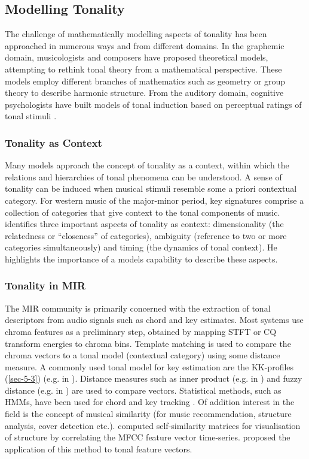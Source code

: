 \documentclass{article}
\begin{document}
\subsection{Modelling Tonality}
\label{sec-2-2}

The challenge of mathematically modelling aspects of tonality has been
approached in numerous ways and from different domains. In the
graphemic domain, musicologists and composers have proposed
theoretical models, attempting to rethink tonal theory from a
mathematical perspective. These models employ different branches of
mathematics such as geometry \citep{Tymoczko2012} or group theory
\citep{Ring2011} to describe harmonic structure. From the auditory
domain, cognitive psychologists have built models of tonal induction
based on perceptual ratings of tonal stimuli \citep{Krumhansl1990}.
\subsubsection{Tonality as Context}
\label{sec-2-2-1}

Many models approach the concept of tonality as a context, within
which the relations and hierarchies of tonal phenomena can be
understood. A sense of tonality can be induced when musical stimuli
resemble some a priori contextual category. For western music of the
major-minor period, key signatures comprise a collection of categories
that give context to the tonal components of
music. \citet{Martorell2013} identifies three important aspects of
tonality as context: dimensionality (the relatedness or ``closeness'' of
categories), ambiguity (reference to two or more categories
simultaneously) and timing (the dynamics of tonal context). He
highlights the importance of a models capability to describe these
aspects. 
\subsubsection{Tonality in MIR}
\label{sec-2-2-2}

The MIR community is primarily concerned with the extraction of tonal
descriptors from audio signals such as chord and key estimates. Most
systems use chroma features as a preliminary step, obtained by mapping
STFT or CQ transform energies to chroma bins. Template matching is
used to compare the chroma vectors to a tonal model (contextual
category) using some distance measure. A commonly used tonal model for
key estimation are the KK-profiles \citep{Krumhansl1990} (\ref{sec-5-3}) (e.g. in \citealt{Gomez2006}). Distance measures such as
inner product (e.g. in \citealt{Gomez2006}) and fuzzy distance
(e.g. in \citealt{Purwins2000}) are used to compare
vectors. Statistical methods, such as HMMs, have been used for chord
and key tracking \citep{Chai2005}. Of addition interest in the field
is the concept of musical similarity (for music recommendation,
structure analysis, cover detection etc.). \citet{Foote2000} computed
self-similarity matrices for visualisation of structure by correlating
the MFCC feature vector time-series. \citet{Gomez2006} proposed the
application of this method to tonal feature vectors.
\end{document}
